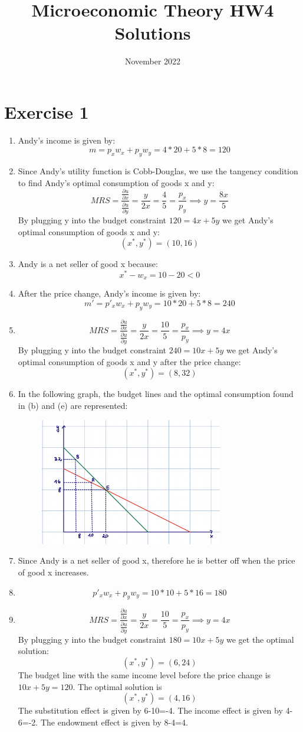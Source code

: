 \documentclass{article}
\title{Microeconomic Theory HW4 Solutions}
\author{}
\date{November 2022}
\begin{document}
\maketitle

\section*{Exercise 1}
\begin{enumerate}[label=(\alph*)]
\item Andy’s income is given by:
\[m=p_xw_x+p_yw_y=4*20+5*8=120\]
\item Since Andy's utility function is Cobb-Douglas, we use the tangency condition to find Andy’s optimal consumption of goods x and y: 
\[ MRS= \frac{\frac{\partial u}{\partial x}}{\frac{\partial u}{\partial y}}=\frac{y}{2x}= \frac{4}{5}= \frac{p_x}{p_y} \implies y= \frac{8x}{5} \]
By plugging y into the budget constraint $120=4x+5y$ we get Andy’s optimal consumption of goods x and y:
\[ (x^*, y^*)=(10,16)\]
\item Andy is a net seller of good x because:
\[x^*-w_x=10-20<0\]
\item After the price change, Andy's income is given by:
\[m'=p'_xw_x+p_yw_y=10*20+5*8=240\]
\item \[ MRS= \frac{\frac{\partial u}{\partial x}}{\frac{\partial u}{\partial y}}=\frac{y}{2x}= \frac{10}{5}= \frac{p_x}{p_y} \implies y=4x \]
By plugging y into the budget constraint $240=10x+5y$ we get Andy’s optimal consumption of goods x and y after the price change:
\[ (x^*, y^*)=(8,32)\]
\item In the following graph, the budget lines and the optimal consumption found in (b) and (e) are represented:
\begin{figure}[H]
    \centering
    \includegraphics[width=8cm]{fig1.png}
    \caption{}
    \label{fig:galaxy}
\end{figure}
\item Since Andy is a net seller of good x, therefore he is better off when the price of good x increases.
\item \[ p'_xw_x+p_yw_y=10*10+5*16=180\]
\item \[ MRS= \frac{\frac{\partial u}{\partial x}}{\frac{\partial u}{\partial y}}=\frac{y}{2x}= \frac{10}{5}= \frac{p_x}{p_y} \implies y=4x \]
By plugging y into the budget constraint $180=10x+5y$ we get the optimal solution:
\[ (x^*, y^*)=(6,24)\]
The budget line with the same income level before the price change is $10x+5y=120$. The optimal solution is \[(x^*, y^*)=(4,16)\]
The substitution effect is given by 6-10=-4.
The income effect is given by 4-6=-2.
The endowment effect is given by 8-4=4.
\end{enumerate}
\end{document}
